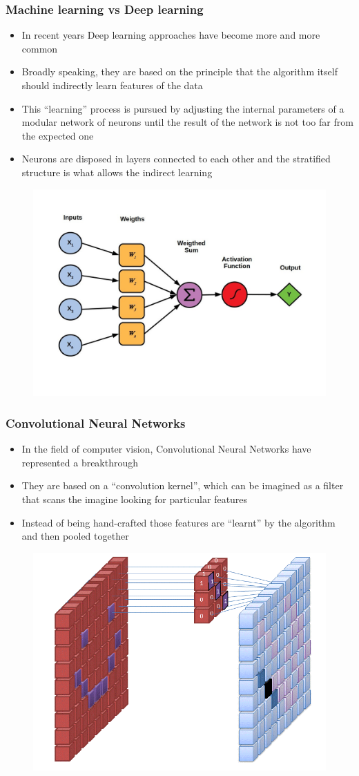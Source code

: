 \documentclass{beamer}
\begin{document}
\begin{frame}
	\frametitle{Machine learning vs Deep learning}
	\begin{itemize}
		\item In recent years Deep learning approaches have become more and more common
		\item Broadly speaking, they are based on the principle that the algorithm itself should indirectly learn features of the data
		\item This ``learning'' process is pursued by adjusting the internal parameters of a modular network of neurons until the result of the network is not too far from the expected one
		\item Neurons are disposed in layers connected to each other and the stratified structure is what allows the indirect learning
	\end{itemize}
	\begin{figure}[h]
		\centering
		\includegraphics[width=0.5\linewidth]{img/perceptron}
		\label{fig:perceptron}
	\end{figure}
\end{frame}
\begin{frame}
	\frametitle{Convolutional Neural Networks}
	\begin{itemize}
		\item In the field of computer vision, Convolutional Neural Networks have represented a breakthrough
		\item  They are based on a ``convolution kernel'', which can be imagined as a filter that scans the imagine looking for particular features
		\item Instead of being hand-crafted those features are ``learnt'' by the algorithm and then pooled together
	\end{itemize}
	\begin{figure}[h]
		\centering
		\includegraphics[width=0.5\linewidth]{img/kernel}
		\label{fig:kernel}
	\end{figure}
\end{frame}
\end{document}

